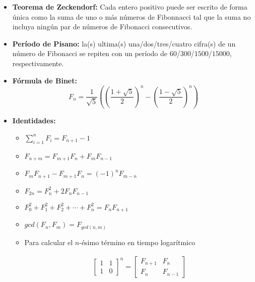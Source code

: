 \begin{itemize}
	\item{\textbf{Teorema de Zeckendorf:} Cada entero positivo puede ser escrito de forma \'unica como la suma 
		de uno o m\'as n\'umeros de Fibonnacci tal que la suma no incluya ning\'un par de n\'umeros de Fibonacci consecutivos.
	}
	\item{\textbf{Per\'iodo de Pisano:} la(s) ultima(s) una/dos/tres/cuatro cifra(s) de un n\'umero de Fibonacci se 
	    repiten con un per\'iodo de $60$/$300$/$1500$/$15000$, respectivamente.
	}
	\item{\textbf{F\'ormula de Binet:}
		$$F_n = \frac{1}{\sqrt{5}} \left( {\left( { \frac{1 + \sqrt{5}}{2} }\right)^{n} - {\left( { \frac{1 - \sqrt{5}}{2} }\right)^{n} }} \right)$$
	}
	\item{\textbf{Identidades:}
		\begin{itemize}
			\item{$\sum_{i=1}^{n}F_i = F_{n+1} - 1$}
		    \item{${F_{n+m}} = F_{m+1} F_n + F_m F_{n-1}$}
		    \item{$F_m F_{n+1} - F_{m+1} F_n = (-1)^n F_{m-n}$}
		    \item{$F_{2n} = F^2_n + 2 F_n F_{n-1}$}
		    \item{$F_0^2 + F_1^2 + F_2^2 + \cdots + F_n^2 = F_n F_{n+1}$}
		    \item{$gcd(F_n, F_m) = F_{gcd(n, m)}$}
		    \item{
		        Para calcular el $n$-\'esimo t\'ermino en tiempo logar\'itmico
		        
				\begin{gather*}
					{\begin{bmatrix} 1 & 1 \\ 1 & 0 \end{bmatrix}} ^ n
					=
					\begin{bmatrix}
						F_{n+1} & F_n \\
						F_n & F_{n-1}
					\end{bmatrix}
				\end{gather*}
		    }		
		\end{itemize}
	}
\end{itemize}

